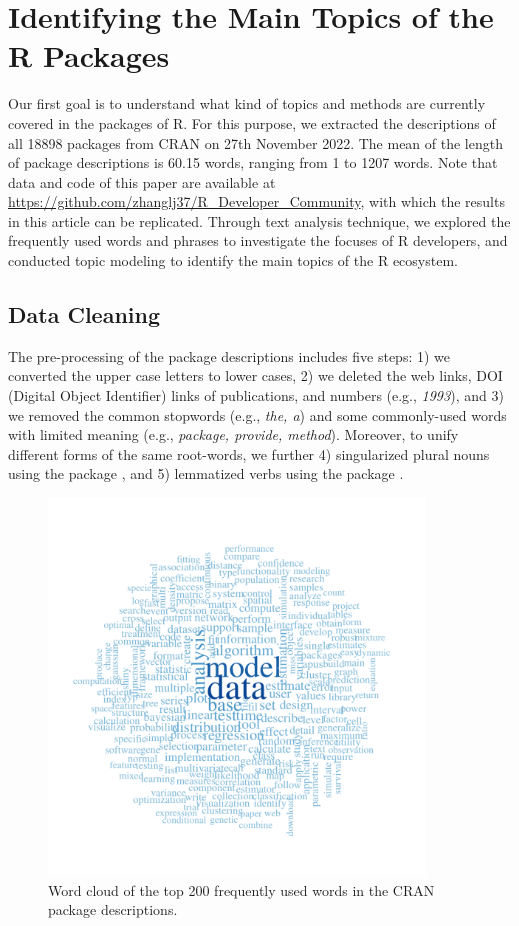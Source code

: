 \section{Identifying the Main Topics of the R Packages}


Our first goal is to understand what kind of topics and methods are currently covered in the packages of R. For this purpose, we extracted the descriptions of all 18898 packages from CRAN on 27th November 2022. The mean of the length of package descriptions is 60.15 words, ranging from 1 to 1207 words. Note that data and code of this paper are available at \url{https://github.com/zhanglj37/R_Developer_Community}, with which the results in this article can be replicated. Through text analysis technique, we explored the frequently used words and phrases to investigate the focuses of R developers, and conducted topic modeling to identify the main topics of the R ecosystem.


\subsection{Data Cleaning}

The pre-processing of the package descriptions includes five steps: 1) we converted the upper case letters to lower cases, 2) we deleted the web links, DOI (Digital Object Identifier) links of publications, and numbers (e.g., {\it 1993}), and 3) we removed the common stopwords (e.g., {\it the, a}) and some commonly-used words with limited meaning (e.g., {\it package, provide, method}). Moreover, to unify different forms of the same root-words, we further 4) singularized plural nouns using the  package \citep{christensen2019semna}, and 5) lemmatized verbs using the  package \citep{spacyr}.


\begin{figure}
\centering
    \includegraphics[width=10cm]{fig/wd_plot2.pdf}
    \caption{Word cloud of the top 200 frequently used words in the CRAN package descriptions.}
    \label{fig:wd_plot}
\end{figure}
	

